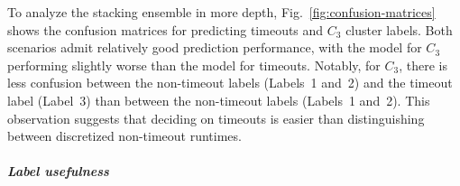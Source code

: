 \documentclass[sn-basic, Numbered]{sn-jnl} %
\begin{document}
To analyze the stacking ensemble in more depth, Fig.~\ref{fig:confusion-matrices} shows the confusion matrices for predicting timeouts and $C_3$ cluster labels.
Both scenarios admit relatively good prediction performance, with the model for $C_3$ performing slightly worse than the model for timeouts.
Notably, for $C_3$, there is less confusion between the non-timeout labels (Labels~1 and~2) and the timeout label (Label~3) than between the non-timeout labels (Labels~1 and~2).
This observation suggests that deciding on timeouts is easier than distinguishing between discretized non-timeout runtimes.

\subparagraph{Label usefulness}

\end{document}
